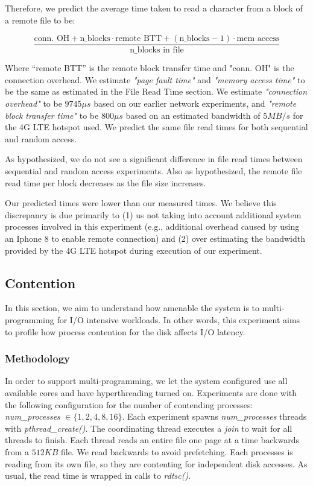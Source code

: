 \documentclass[sigconf]{acmart}
\begin{document}
Therefore, we predict the average time taken to read a character from a block of a remote file to be:

$$\frac{\text{conn. OH} + \text{n\_blocks} \cdot \text{remote BTT} +(\text{n\_blocks}-1) \cdot \text{mem access}} {\text{n\_blocks in file}}$$

Where ``remote BTT'' is the remote block transfer time and "conn. OH" is the connection overhead. We estimate \textit{"page fault time"} and \textit{"memory access time"} to be the same as estimated in the File Read Time section. We estimate \textit{"connection overhead"} to be $9745\mu s$ based on our earlier network experiments, and \textit{"remote block transfer time"} to be $800\mu s$ based on an estimated bandwidth of $5MB/s$ for the 4G LTE hotspot used. We predict the same file read times for both sequential and random access.

As hypothesized, we do not see a significant difference in file read times between sequential and random access experiments. Also as hypothesized, the remote file read time per block decreases as the file size increases.

Our predicted times were lower than our measured times. We believe this discrepancy is due primarily to (1) us not taking into account additional system processes involved in this experiment (e.g., additional overhead caused by using an Iphone 8 to enable remote connection) and (2) over estimating the bandwidth provided by the 4G LTE hotspot during execution of our experiment.

\subsection{Contention}
In this section, we aim to understand how amenable the system is to multi-programming for I/O intensive workloads. In other words, this experiment aims to profile how process contention for the disk affects I/O latency.

\subsubsection{Methodology}
In order to support multi-programming, we let the system configured use all available cores and have hyperthreading turned on. Experiments are done with the following configuration for the number of contending processes: \textit{num\_processes} $\in \{1,2,4,8,16\}$. Each experiment spawns \textit{num\_processes} threads with \textit{pthread\_create()}. The coordinating thread executes a \textit{join} to wait for all threads to finish. Each thread reads an entire file one page at a time backwards from a $512KB$ file. We read backwards to avoid prefetching. Each processes is reading from its own file, so they are contenting for independent disk accesses. As usual, the read time is wrapped in calls to \textit{rdtsc()}.
\end{document}
